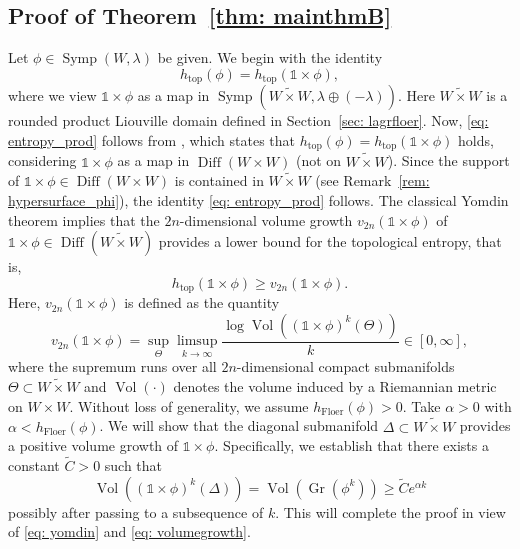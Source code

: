 \documentclass[12pt]{article}
\renewcommand{\ge}{\geqslant}
\theoremstyle{theorem}
\theoremstyle{definition}
\theoremstyle{remark}
\numberwithin{equation}{section}
\DeclareMathOperator{\floer}{Floer}
\DeclareMathOperator{\topo}{top}
\DeclareMathOperator{\Vol}{Vol}
\DeclareMathOperator{\Gr}{Gr}
\DeclareMathOperator{\Diff}{Diff}
\DeclareMathOperator{\Symp}{Symp}
\begin{document}
\subsection{Proof of Theorem~\ref{thm: mainthmB}}
Let $\phi\in\Symp(W,\lambda)$ be given.
We begin with the identity
\begin{equation}\label{eq: entropy_prod}
h_{\topo}(\phi) = h_{\topo}(\mathds{1} \times \phi),
\end{equation}
where we view $\mathds{1} \times \phi$ as a map in $\Symp (\widetilde{W\times W},\lambda\oplus(-\lambda))$.
Here $\widetilde{W\times W}$ is a rounded product Liouville domain defined in Section~\ref{sec: lagrfloer}.
Now, \eqref{eq: entropy_prod} follows from \cite[Proposition~3.1.7]{KaHa95}, which states that $h_{\topo}(\phi)=h_{\topo}(\mathds{1}\times \phi)$ holds, considering $\mathds{1}\times\phi$ as a map in $\Diff(W\times W)$ (not on $\widetilde{W\times W}$).
Since the support of $\mathds{1}\times \phi\in\Diff(W\times W)$ is contained in $\widetilde{W\times W}$ (see Remark~\ref{rem: hypersurface_phi}), the identity \eqref{eq: entropy_prod} follows.
The classical Yomdin theorem \cite[Theorem~1.4]{Yo87} implies that the $2n$-dimensional volume growth $v_{2n}(\mathds{1} \times \phi)$ of $\mathds{1} \times \phi\in \Diff(\widetilde{W\times W})$ provides a lower bound for the topological entropy, that is,
\begin{equation}\label{eq: yomdin}
	h_{\topo}(\mathds{1} \times \phi)\ge v_{2n}(\mathds{1} \times \phi).
\end{equation}
Here, $v_{2n}(\mathds{1} \times \phi)$ is defined as the quantity
\begin{equation}\label{eq: volumegrowth}
	v_{2n}(\mathds{1} \times \phi)=\sup_{\Theta}\limsup_{k\to \infty} \frac{\log \Vol((\mathds{1} \times \phi)^k(\Theta))}{k} \in [0,\infty],
\end{equation}
where the supremum runs over all $2n$-dimensional compact submanifolds $\Theta\subset \widetilde{W\times W}$ and $\Vol(\cdot)$ denotes the  volume induced by a Riemannian metric on $W\times W$.
Without loss of generality, we  assume $h_{\floer}(\phi)>0$.
Take $\alpha>0$ with $\alpha<h_{\floer}(\phi)$.
We will show that the diagonal submanifold $\Delta\subset \widetilde{W\times W}$ provides a positive volume growth of $\mathds{1}\times \phi$.
Specifically, we establish that there exists a constant $\tilde{C}>0$ such that
\begin{equation}\label{eq: volume_exp_ineq}
	\Vol((\mathds{1} \times \phi)^k(\Delta))=\Vol(\Gr(\phi^k)) \ge  \tilde{C} e^{\alpha k}
\end{equation}
possibly after passing to a subsequence of $k$.
This will complete the proof in view of \eqref{eq: yomdin} and \eqref{eq: volumegrowth}.
\end{document}
